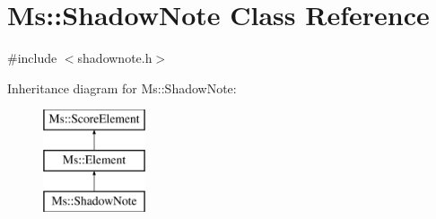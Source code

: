 \hypertarget{class_ms_1_1_shadow_note}{}\section{Ms\+:\+:Shadow\+Note Class Reference}
\label{class_ms_1_1_shadow_note}


{\ttfamily \#include $<$shadownote.\+h$>$}

Inheritance diagram for Ms\+:\+:Shadow\+Note\+:\begin{figure}[H]
\begin{center}
\leavevmode
\includegraphics[height=3.000000cm]{class_ms_1_1_shadow_note}
\end{center}
\end{figure}

